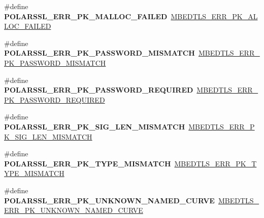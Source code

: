 \begin{DoxyCompactItemize}
\item 
\mbox{\label{compat-1_83_8h_ac615b9e36b084faf6d51dc1f3405e563}} 
\#define {\bfseries P\+O\+L\+A\+R\+S\+S\+L\+\_\+\+E\+R\+R\+\_\+\+P\+K\+\_\+\+M\+A\+L\+L\+O\+C\+\_\+\+F\+A\+I\+L\+ED}~\mbox{\hyperlink{pk_8h_acf55308a7cac0363ea25de294c8b633d}{M\+B\+E\+D\+T\+L\+S\+\_\+\+E\+R\+R\+\_\+\+P\+K\+\_\+\+A\+L\+L\+O\+C\+\_\+\+F\+A\+I\+L\+ED}}
\item 
\mbox{\label{compat-1_83_8h_a8fade72c0a20c8d5f13ce3a209db58ca}} 
\#define {\bfseries P\+O\+L\+A\+R\+S\+S\+L\+\_\+\+E\+R\+R\+\_\+\+P\+K\+\_\+\+P\+A\+S\+S\+W\+O\+R\+D\+\_\+\+M\+I\+S\+M\+A\+T\+CH}~\mbox{\hyperlink{pk_8h_a24723299c688b1ca6cfa613c19cef6f5}{M\+B\+E\+D\+T\+L\+S\+\_\+\+E\+R\+R\+\_\+\+P\+K\+\_\+\+P\+A\+S\+S\+W\+O\+R\+D\+\_\+\+M\+I\+S\+M\+A\+T\+CH}}
\item 
\mbox{\label{compat-1_83_8h_a420e18624ba63e48d18c4e647a199904}} 
\#define {\bfseries P\+O\+L\+A\+R\+S\+S\+L\+\_\+\+E\+R\+R\+\_\+\+P\+K\+\_\+\+P\+A\+S\+S\+W\+O\+R\+D\+\_\+\+R\+E\+Q\+U\+I\+R\+ED}~\mbox{\hyperlink{pk_8h_a9c1de7ccb4e18a3ea74b35c4e2cb7527}{M\+B\+E\+D\+T\+L\+S\+\_\+\+E\+R\+R\+\_\+\+P\+K\+\_\+\+P\+A\+S\+S\+W\+O\+R\+D\+\_\+\+R\+E\+Q\+U\+I\+R\+ED}}
\item 
\mbox{\label{compat-1_83_8h_a455daffab2c5f217faf4e65c26a8c505}} 
\#define {\bfseries P\+O\+L\+A\+R\+S\+S\+L\+\_\+\+E\+R\+R\+\_\+\+P\+K\+\_\+\+S\+I\+G\+\_\+\+L\+E\+N\+\_\+\+M\+I\+S\+M\+A\+T\+CH}~\mbox{\hyperlink{pk_8h_abce78b0c7f04018824b70b816e091dc0}{M\+B\+E\+D\+T\+L\+S\+\_\+\+E\+R\+R\+\_\+\+P\+K\+\_\+\+S\+I\+G\+\_\+\+L\+E\+N\+\_\+\+M\+I\+S\+M\+A\+T\+CH}}
\item 
\mbox{\label{compat-1_83_8h_adfc2587a1c20023c21a1121d3a396d2f}} 
\#define {\bfseries P\+O\+L\+A\+R\+S\+S\+L\+\_\+\+E\+R\+R\+\_\+\+P\+K\+\_\+\+T\+Y\+P\+E\+\_\+\+M\+I\+S\+M\+A\+T\+CH}~\mbox{\hyperlink{pk_8h_a7a7fb7cb156476722c09de42368156dc}{M\+B\+E\+D\+T\+L\+S\+\_\+\+E\+R\+R\+\_\+\+P\+K\+\_\+\+T\+Y\+P\+E\+\_\+\+M\+I\+S\+M\+A\+T\+CH}}
\item 
\mbox{\label{compat-1_83_8h_a0c3ac0ce0bef7a1903bdb98fce9b5e6e}} 
\#define {\bfseries P\+O\+L\+A\+R\+S\+S\+L\+\_\+\+E\+R\+R\+\_\+\+P\+K\+\_\+\+U\+N\+K\+N\+O\+W\+N\+\_\+\+N\+A\+M\+E\+D\+\_\+\+C\+U\+R\+VE}~\mbox{\hyperlink{pk_8h_a802d8b95e9b6a517d597dc92cb591e99}{M\+B\+E\+D\+T\+L\+S\+\_\+\+E\+R\+R\+\_\+\+P\+K\+\_\+\+U\+N\+K\+N\+O\+W\+N\+\_\+\+N\+A\+M\+E\+D\+\_\+\+C\+U\+R\+VE}}

\end{DoxyCompactItemize}
